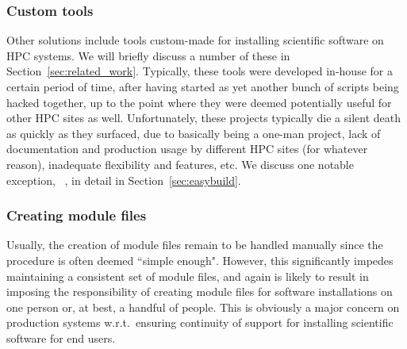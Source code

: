 \subsubsection{Custom tools}

Other solutions include tools custom-made for installing scientific software
on HPC systems. We will briefly discuss a number of these in
Section~\ref{sec:related_work}. Typically, these tools were developed in-house for
a certain period of time, after having started as yet another bunch of
scripts being hacked together, up to the point where they were deemed potentially
useful for other HPC sites as well. Unfortunately, these projects typically die a
silent death as quickly as they surfaced, due to basically being a one-man project,
lack of documentation and production usage by different HPC sites (for whatever
reason), inadequate flexibility and features, etc. We discuss one notable
exception, \easybuild{}~\cite{EasyBuildSC12}, in detail in
Section~\ref{sec:easybuild}.

\subsubsection{Creating module files}

Usually, the creation of module files remain to be handled manually since the
procedure is often deemed ``simple enough". However, this significantly impedes
maintaining a consistent set of module files, and again is likely to result in
imposing the responsibility of creating module files for software installations
on one person or, at best, a handful of people. This is obviously a major concern
on production systems w.r.t.~ensuring continuity of support for installing
scientific software for end users.


